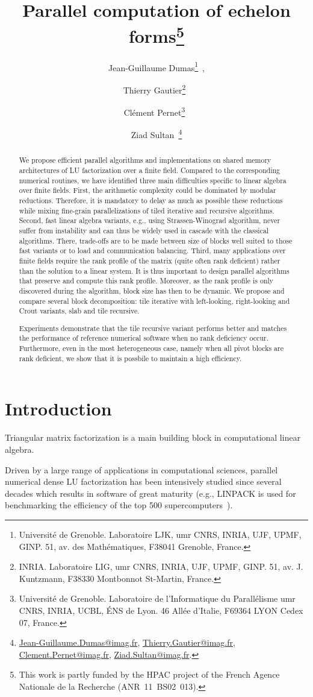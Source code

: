 \documentclass{article}
\author{
Jean-Guillaume Dumas\footnote{
Universit\'e de Grenoble. 
Laboratoire LJK,
umr CNRS, INRIA, UJF, UPMF, GINP.
51, av. des Math\'ematiques, F38041 Grenoble, France.
}~\footnotemark[4], 
\and Thierry Gautier\footnote{
INRIA.
Laboratoire LIG,
umr CNRS, INRIA, UJF, UPMF, GINP.
51, av. J. Kuntzmann, F38330 Montbonnot St-Martin, France.
}~\footnotemark[4]
\and Cl\'ement Pernet\footnote{
Universit\'e de Grenoble.
Laboratoire de l'Informatique du Parall\'elisme 
umr CNRS, INRIA, UCBL, \'ENS de Lyon.
46 All\'ee d'Italie, F69364 LYON Cedex 07, France.
}~\footnotemark[4]
\and Ziad Sultan\footnotemark[1]~\footnotemark[2]
\footnote{
\href{mailto:Jean-Guillaume.Dumas@imag.fr}{Jean-Guillaume.Dumas@imag.fr},
\href{mailto:Thierry.Gautier@imag.fr}{Thierry.Gautier@imag.fr},
\href{mailto:Clement.Pernet@imag.fr}{Clement.Pernet@imag.fr},
\href{mailto:Ziad.Sultan@imag.fr}{Ziad.Sultan@imag.fr}.
}
}
\title{Parallel computation of echelon forms\thanks{\small This work is partly funded by the HPAC project of the French Agence Nationale de la Recherche (ANR~11~BS02~013).}}
\date{}
\begin{document}
\maketitle
\begin{abstract}
We propose efficient parallel algorithms and implementations on
shared memory architectures of LU factorization over a finite field.
Compared to the corresponding numerical routines, we have identified three main
difficulties specific to linear algebra over finite fields.
First, the arithmetic complexity could be dominated
by modular reductions. Therefore, it is mandatory to delay as much as
possible these reductions while mixing fine-grain parallelizations of
tiled iterative and recursive algorithms.
Second, fast linear algebra variants, e.g., using Strassen-Winograd
algorithm, never suffer from instability and can thus be widely used in
cascade with the classical algorithms. There, trade-offs are to be
made between size of blocks well suited to those fast variants or to
load and communication balancing. 
Third, many applications over finite fields require the rank profile
of the matrix (quite often rank deficient) rather than the solution to
a linear system. It is thus important to design parallel algorithms that
preserve and compute this rank profile. Moreover, as the rank profile is only
discovered during the algorithm, block size has then to be dynamic.
We propose and compare several block decomposition: tile iterative with
left-looking, right-looking and Crout variants, slab and tile recursive.
 
 
 
 
 
Experiments demonstrate that the tile recursive variant performs better and
matches the performance of reference numerical software when no rank deficiency
occur. Furthermore, even in
the most heterogeneous case, namely when all pivot blocks are rank
deficient, we show that it is possbile to maintain a high efficiency.
\end{abstract}

\section{Introduction}

Triangular matrix factorization is a main building block in  computational  linear
algebra. 
 
Driven by a large range of applications in computational sciences, parallel
numerical dense LU factorization has been intensively studied since 
several decades which results in software of great maturity (e.g., LINPACK is used for benchmarking the efficiency of the top
500 supercomputers~\cite{DLP03}).
 
\end{document}
